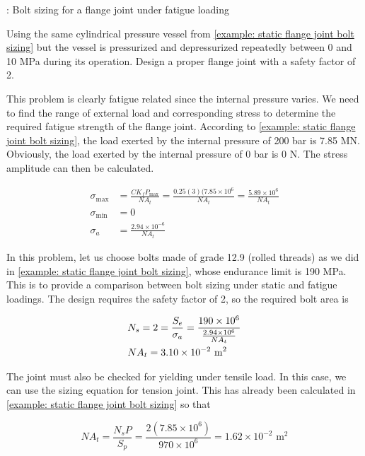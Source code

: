 \documentclass[
10pt,
a4paper,
openany,
svgnames,
]{book}
\begin{document}
\begin{example}: Bolt sizing for a flange joint under fatigue loading

Using the same cylindrical pressure vessel from \cref{example: static flange joint bolt sizing} but the vessel is pressurized and depressurized repeatedly between 0 and 10 MPa during its operation. Design a proper flange joint with a safety factor of 2.
\end{example}
\begin{solution}
This problem is clearly fatigue related since the internal pressure varies. We need to find the range of external load and corresponding stress to determine the required fatigue strength of the flange joint. According to \cref{example: static flange joint bolt sizing}, the load exerted by the internal pressure of 200 bar is 7.85 MN. Obviously, the load exerted by the internal pressure of 0 bar is 0 N. The stress amplitude can then be calculated.

\begin{align*}
  \sigma_{\max } &= \frac{CK_fP_{\max}}{NA_t} = \frac{0.25(3)(7.85 \times 10^6}{NA_t} = \frac{5.89 \times 10^6}{NA_t} \\ 
  \sigma_{\min } &= 0 \\ 
  \sigma_a&= \frac{2.94 \times 10^{-6}}{NA_t} 
\end{align*}

In this problem, let us choose bolts made of grade 12.9 (rolled threads) as we did in \cref{example: static flange joint bolt sizing}, whose endurance limit is 190 MPa. This is to provide a comparison between bolt sizing under static and fatigue loadings. The design requires the safety factor of 2, so the required bolt area is

\[\begin{gathered}
  N_s = 2 = \frac{S_e}{\sigma_a} = \frac{190 \times 10^6}{\frac{2.94 \times 10^6}{NA_t}} \hfill \\
  NA_t = 3.10 \times 10^{-2} \text{ m}^2 \hfill \\ 
\end{gathered} \]

The joint must also be checked for yielding under tensile load. In this case, we can use the sizing equation for tension joint. This has already been calculated in \cref{example: static flange joint bolt sizing} so that

\[NA_t = \frac{N_sP}{S_p} = \frac{2(7.85 \times 10^6)}{970 \times 10^6} = 1.62 \times 10^{-2} \text{ m}^2\]


\end{solution}
\end{document}
